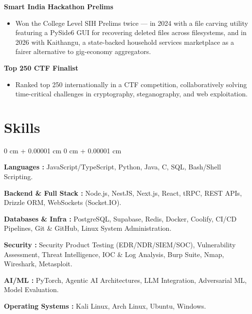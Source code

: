 \documentclass[10pt, a4paper]{article}
\newenvironment{highlights}{
    \begin{itemize}[
        topsep=0.10 cm,
        parsep=0.10 cm,
        partopsep=0pt,
        itemsep=0pt,
        leftmargin=0 cm + 10pt
    ]
}{
    \end{itemize}
} %
\newenvironment{onecolentry}{
    \begin{adjustwidth}{
        0 cm + 0.00001 cm
    }{
        0 cm + 0.00001 cm
    }
}{
    \end{adjustwidth}
} %
\begin{document}
                \textbf{Smart India Hackathon Prelims}
                \begin{highlights}
                    \item Won the College Level SIH Prelims twice — in 2024 with a file carving utility featuring a PySide6 GUI for recovering deleted files across filesystems, and in 2026 with Kaithangu, a state-backed household services marketplace as a fairer alternative to gig-economy aggregators.
                \end{highlights}

            \textbf{Top 250 CTF Finalist}
            \begin{highlights}
                \item Ranked top 250 internationally in a CTF competition, collaboratively solving time-critical challenges in cryptography, steganography, and web exploitation.
            \end{highlights}
                
    \section{Skills}

    \begin{onecolentry}

        \textbf{Languages :} JavaScript/TypeScript, Python, Java, C, SQL, Bash/Shell Scripting.

        \vspace{0.1 cm}

        \textbf{Backend \& Full Stack :} Node.js, NestJS, Next.js, React, tRPC, REST APIs, Drizzle ORM, WebSockets (Socket.IO).

        \vspace{0.1 cm}

        \textbf{Databases \& Infra :} PostgreSQL, Supabase, Redis, Docker, Coolify, CI/CD Pipelines, Git \& GitHub, Linux System Administration.

        \vspace{0.1 cm}

        \textbf{Security :} Security Product Testing (EDR/NDR/SIEM/SOC), Vulnerability Assessment, Threat Intelligence, IOC \& Log Analysis, Burp Suite, Nmap, Wireshark, Metasploit.

        \vspace{0.1 cm}

        \textbf{AI/ML :} PyTorch, Agentic AI Architectures, LLM Integration, Adversarial ML, Model Evaluation.

        \vspace{0.1 cm}

        \textbf{Operating Systems :} Kali Linux, Arch Linux, Ubuntu, Windows.

    \end{onecolentry}
\end{document}

